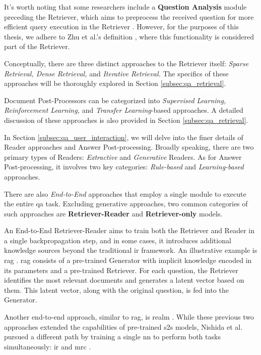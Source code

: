 It's worth noting that some researchers include a \textbf{Question Analysis} module preceding the Retriever, which aims to preprocess the received question for more efficient query execution in the Retriever \cite{nassiri_transformer_2023}. However, for the purposes of this thesis, we adhere to Zhu et al.'s definition \cite{zhu_retrieving_2021}, where this functionality is considered part of the Retriever.

Conceptually, there are three distinct approaches to the Retriever itself: \textit{Sparse Retrieval, Dense Retrieval,} and \textit{Iterative Retrieval.} The specifics of these approaches will be thoroughly explored in Section \ref{subsec:qa_retrieval}.

Document Post-Processors can be categorized into \textit{Supervised Learning, Reinforcement Learning,} and \textit{Transfer Learning}-based approaches. A detailed discussion of these approaches is also provided in Section \ref{subsec:qa_retrieval}.

In Section \ref{subsec:qa_user_interaction}, we will delve into the finer details of Reader approaches and Answer Post-processing. Broadly speaking, there are two primary types of Readers: \textit{Extractive} and \textit{Generative} Readers. As for Answer Post-processing, it involves two key categories: \textit{Rule-based} and \textit{Learning-based} approaches.

There are also \textit{End-to-End} approaches that employ a single module to execute the entire \gls{qa} task. Excluding generative approaches, two common categories of such approaches are \textbf{Retriever-Reader} and \textbf{Retriever-only} models.

An End-to-End Retriever-Reader aims to train both the Retriever and Reader in a single backpropagation step, and in some cases, it introduces additional knowledge sources beyond the traditional \gls{ir} framework. An illustrative example is \gls{rag} \cite{lewis_retrieval-augmented_2021}. \gls{rag} consists of a pre-trained Generator with implicit knowledge encoded in its parameters and a pre-trained Retriever. For each question, the Retriever identifies the most relevant documents and generates a latent vector based on them. This latent vector, along with the original question, is fed into the Generator.

Another end-to-end approach, similar to \gls{rag}, is \gls{realm} \cite{guu_realm_2020}. While these previous two approaches extended the capabilities of pre-trained \gls{s2s} models, Nishida et al. pursued a different path by training a single \gls{nn} to perform both tasks simultaneously: \gls{ir} and \gls{mrc} \cite{nishida_retrieve-and-read_2018}.

